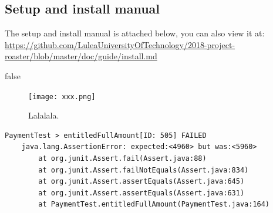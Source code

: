 \documentclass[12pt,a4paper]{report}
\begin{document}
\begin{appendix}
\chapter{Setup and install manual}
The setup and install manual is attached below, you can also view it at: \\ \url{https://github.com/LuleaUniversityOfTechnology/2018-project-roaster/blob/master/doc/guide/install.md}

\end{appendix}

\if false

\begin{figure}[H]
    \centering
    \texttt{[image: xxx.png]}
    \caption{Lalalala.}
    \label{fig:my_label}
\end{figure}

\begin{verbatim}
PaymentTest > entitledFullAmount[ID: 505] FAILED
    java.lang.AssertionError: expected:<4960> but was:<5960>
        at org.junit.Assert.fail(Assert.java:88)
        at org.junit.Assert.failNotEquals(Assert.java:834)
        at org.junit.Assert.assertEquals(Assert.java:645)
        at org.junit.Assert.assertEquals(Assert.java:631)
        at PaymentTest.entitledFullAmount(PaymentTest.java:164)
\end{verbatim}
\end{document}
